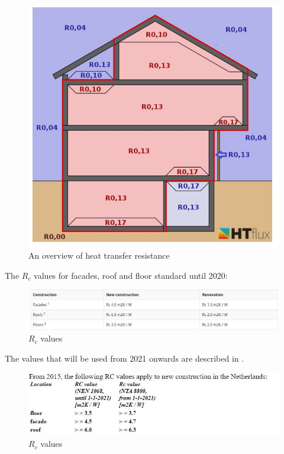 \begin{figure}[H]
	\centering
	\includegraphics[width=0.8\columnwidth]{Pictures/Overview of heat resistances.JPG}
	\caption[Short title]{An overview of heat transfer resistance \cite{Heat_transfer_resistance}}
	\label{fig:overview}
	\end{figure}


The $R_c$ values for facades, roof and floor standard until 2020:

\begin{figure}[H]
	\centering
	\includegraphics[width=1.2\columnwidth]{Pictures/Rc_values_2020.JPG}
	\caption[Short title]{$R_c$ values\cite{Bouwbesluit}}
	\label{fig:Rc}
	\end{figure}

The values that will be used from 2021 onwards are described in \cite{Vademecum}.

\begin{figure}[H]
	\centering
	\includegraphics[width=1.0\columnwidth]{Pictures/Rc_values_2021.JPG}
	\caption[Short title]{$R_c$ values\cite{Rwaarde}}
	\label{fig:Rc_new}
	\end{figure}

